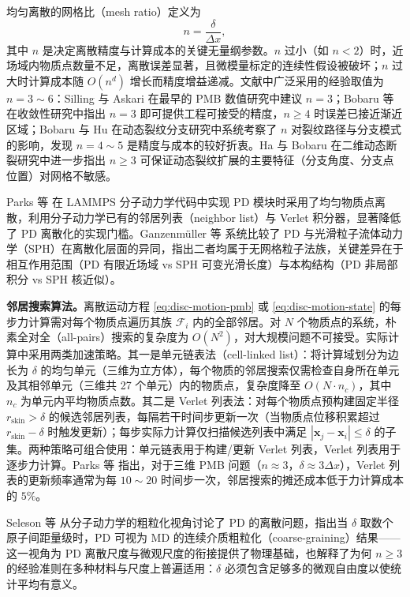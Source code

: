 均匀离散的网格比（mesh ratio）定义为
\begin{equation}
  n = \frac{\delta}{\Delta x},
  \label{eq:disc-mesh-ratio}
\end{equation}
其中 $n$ 是决定离散精度与计算成本的关键无量纲参数。$n$ 过小（如 $n<2$）时，近场域内物质点数量不足，离散误差显著，且微模量标定的连续性假设被破坏；$n$ 过大时计算成本随 $O(n^d)$ 增长而精度增益递减。文献中广泛采用的经验取值为 $n=3\sim6$：Silling 与 Askari \cite{SillingAskari2005} 在最早的 PMB 数值研究中建议 $n=3$；Bobaru 等 \cite{Bobaru2009} 在收敛性研究中指出 $n=3$ 即可提供工程可接受的精度，$n\ge4$ 时误差已接近渐近区域；Bobaru 与 Hu \cite{BobaruHu2012} 在动态裂纹分支研究中系统考察了 $n$ 对裂纹路径与分支模式的影响，发现 $n=4\sim5$ 是精度与成本的较好折衷。Ha 与 Bobaru \cite{HaBobaru2010} 在二维动态断裂研究中进一步指出 $n\ge3$ 可保证动态裂纹扩展的主要特征（分支角度、分支点位置）对网格不敏感。

Parks 等 \cite{Parks2008} 在 LAMMPS 分子动力学代码中实现 PD 模块时采用了均匀物质点离散，利用分子动力学已有的邻居列表（neighbor list）与 Verlet 积分器，显著降低了 PD 离散化的实现门槛。Ganzenm{\"u}ller 等 \cite{Ganzenmuller2015} 系统比较了 PD 与光滑粒子流体动力学（SPH）在离散化层面的异同，指出二者均属于无网格粒子法族，关键差异在于相互作用范围（PD 有限近场域 vs SPH 可变光滑长度）与本构结构（PD 非局部积分 vs SPH 核近似）。

\textbf{邻居搜索算法。}离散运动方程 \eqref{eq:disc-motion-pmb} 或 \eqref{eq:disc-motion-state} 的每步力计算需对每个物质点遍历其族 $\mathcal{F}_i$ 内的全部邻居。对 $N$ 个物质点的系统，朴素全对全（all-pairs）搜索的复杂度为 $O(N^2)$，对大规模问题不可接受。实际计算中采用两类加速策略。其一是单元链表法（cell-linked list）：将计算域划分为边长为 $\delta$ 的均匀单元（三维为立方体），每个物质的邻居搜索仅需检查自身所在单元及其相邻单元（三维共 27 个单元）内的物质点，复杂度降至 $O(N\cdot n_c)$，其中 $n_c$ 为单元内平均物质点数。其二是 Verlet 列表法：对每个物质点预构建固定半径 $r_{\text{skin}}>\delta$ 的候选邻居列表，每隔若干时间步更新一次（当物质点位移积累超过 $r_{\text{skin}}-\delta$ 时触发更新）；每步实际力计算仅扫描候选列表中满足 $|\mathbf{x}_j-\mathbf{x}_i|\le\delta$ 的子集。两种策略可组合使用：单元链表用于构建/更新 Verlet 列表，Verlet 列表用于逐步力计算。Parks 等 \cite{Parks2008} 指出，对于三维 PMB 问题（$n\approx3$，$\delta\approx3\Delta x$），Verlet 列表的更新频率通常为每 $10\sim20$ 时间步一次，邻居搜索的摊还成本低于力计算成本的 $5\%$。

Seleson 等 \cite{Seleson2009} 从分子动力学的粗粒化视角讨论了 PD 的离散问题，指出当 $\delta$ 取数个原子间距量级时，PD 可视为 MD 的连续介质粗粒化（coarse-graining）结果——这一视角为 PD 离散尺度与微观尺度的衔接提供了物理基础，也解释了为何 $n\ge3$ 的经验准则在多种材料与尺度上普遍适用：$\delta$ 必须包含足够多的微观自由度以使统计平均有意义。

